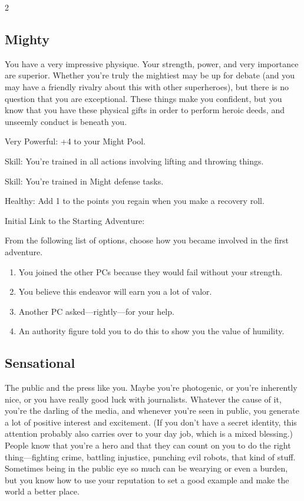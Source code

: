 \begin{multicols}{2}
\subsection{Mighty}

You have a very impressive physique. Your strength, power, and very importance are superior. Whether you’re truly the mightiest may be up for debate (and you may have a friendly rivalry about this with other superheroes), but there is no question that you are exceptional. These things make you confident, but you know that you have these physical gifts in order to perform heroic deeds, and unseemly conduct is beneath you.

Very Powerful: +4 to your Might Pool.

Skill: You’re trained in all actions involving lifting and throwing things.

Skill: You’re trained in Might defense tasks.

Healthy: Add 1 to the points you regain when you make a recovery roll.

Initial Link to the Starting Adventure:

From the following list of options, choose how you became involved in the first adventure.

\begin{enumerate}
\item You joined the other PCs because they would fail without your strength.
\item You believe this endeavor will earn you a lot of valor.
\item Another PC asked—rightly—for your help.
\item An authority figure told you to do this to show you the value of humility.
\end{enumerate}

\subsection{Sensational}

The public and the press like you. Maybe you’re photogenic, or you’re inherently nice, or you have really good luck with journalists. Whatever the cause of it, you’re the darling of the media, and whenever you’re seen in public, you generate a lot of positive interest and excitement. (If you don’t have a secret identity, this attention probably also carries over to your day job, which is a mixed blessing.) People know that you’re a hero and that they can count on you to do the right thing—fighting crime, battling injustice, punching evil robots, that kind of stuff. Sometimes being in the public eye so much can be wearying or even a burden, but you know how to use your reputation to set a good example and make the world a better place.


\end{multicols}
